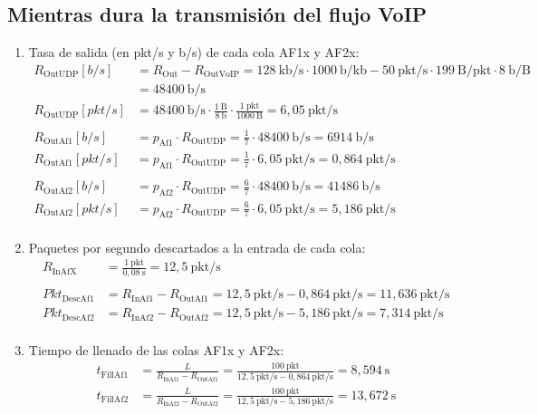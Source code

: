 \subsection{Mientras dura la transmisión del flujo VoIP}
\begin{enumerate}
    \item Tasa de salida (en pkt/s y b/s) de cada cola AF1x y AF2x:
    \[
        \begin{aligned}
            R_{\text{OutUDP}}[b/s] &= R_{\text{Out}} - R_{\text{OutVoIP}} = 128~\text{kb/s} \cdot 1000~\text{b/kb} - 50~\text{pkt/s} \cdot 199~\text{B/pkt} \cdot 8~\text{b/B} \\
                              &= 48400~\text{b/s} \\
            R_{\text{OutUDP}}[pkt/s] &= 48400~\text{b/s} \cdot \frac{1~\text{B}}{8~\text{b}} \cdot \frac{1~\text{pkt}}{1000~\text{B}} = 6,05~\text{pkt/s} \\ \\
            R_{\text{OutAf1}}[b/s] &= p_{\text{Af1}} \cdot R_{\text{OutUDP}} = \frac{1}{7} \cdot 48400~\text{b/s} = 6914~\text{b/s} \\
            R_{\text{OutAf1}}[pkt/s] &= p_{\text{Af1}} \cdot R_{\text{OutUDP}} = \frac{1}{7} \cdot 6,05~\text{pkt/s} = 0,864~\text{pkt/s} \\ \\
            R_{\text{OutAf2}}[b/s] &= p_{\text{Af2}} \cdot R_{\text{OutUDP}} = \frac{6}{7} \cdot 48400~\text{b/s} = 41486~\text{b/s} \\
            R_{\text{OutAf2}}[pkt/s] &= p_{\text{Af2}} \cdot R_{\text{OutUDP}} = \frac{6}{7} \cdot 6,05~\text{pkt/s} = 5,186~\text{pkt/s} \\
        \end{aligned}
    \]
    \item Paquetes por segundo descartados a la entrada de cada cola:
    \[
        \begin{aligned}
            R_{\text{InAfX}} &= \frac{1~\text{pkt}}{0,08~\text{s}} = 12,5~\text{pkt/s} \\ \\
            Pkt_{\text{DescAf1}} &= R_{\text{InAf1}} - R_{\text{OutAf1}} = 12,5~\text{pkt/s} - 0,864~\text{pkt/s} = 11,636~\text{pkt/s} \\
            Pkt_{\text{DescAf2}} &= R_{\text{InAf2}} - R_{\text{OutAf2}} = 12,5~\text{pkt/s} - 5,186~\text{pkt/s} = 7,314~\text{pkt/s} \\
        \end{aligned}
    \]
    \item Tiempo de llenado de las colas AF1x y AF2x:
    \[
        \begin{aligned}
            t_{\text{FillAf1}} &= \frac{L}{R_{\text{InAf1}} - R_{\text{OutAf1}}} = \frac{100~\text{pkt}}{12,5~\text{pkt/s} - 0,864~\text{pkt/s}} = 8,594~\text{s} \\
            t_{\text{FillAf2}} &= \frac{L}{R_{\text{InAf2}} - R_{\text{OutAf2}}} = \frac{100~\text{pkt}}{12,5~\text{pkt/s} - 5,186~\text{pkt/s}} = 13,672~\text{s} \\
        \end{aligned}
    \]
\end{enumerate}

